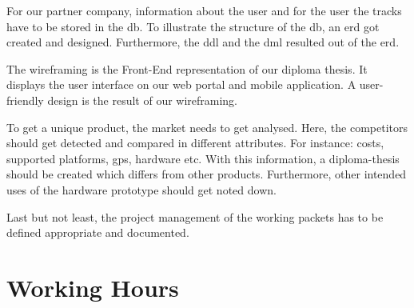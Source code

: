 For our partner company, information about the user and for the user the tracks have to be stored in the \gls{db}. To illustrate the structure of the \gls{db}, an \gls{erd} got created and designed. Furthermore, the \gls{ddl} and the \gls{dml} resulted out of the \gls{erd}.

The wireframing is the Front-End representation of our diploma thesis. It displays the user interface on our web portal and mobile application. A user-friendly design is the result of our wireframing.

To get a unique product, the market needs to get analysed. Here, the competitors should get detected and compared in different attributes. For instance: costs, supported platforms, \gls{gps}, hardware etc. With this information, a diploma-thesis should be created which differs from other products. Furthermore, other intended uses of the hardware prototype should get noted down.

Last but not least, the project management of the working packets has to be defined appropriate and documented.
\section*{Working Hours}
